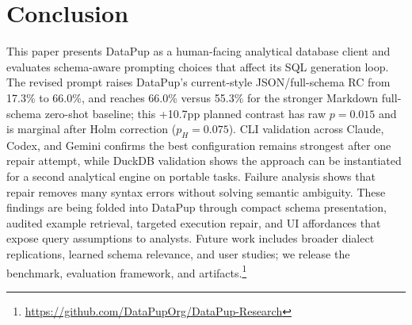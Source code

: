 \documentclass[sigconf, nonacm]{acmart}
\begin{document}
\section{Conclusion}
\label{sec:conclusion}

This paper presents DataPup as a human-facing analytical database client and evaluates schema-aware prompting choices that affect its SQL generation loop. The revised prompt raises DataPup's current-style JSON/full-schema RC from 17.3\% to 66.0\%, and reaches 66.0\% versus 55.3\% for the stronger Markdown full-schema zero-shot baseline; this +10.7pp planned contrast has raw $p{=}0.015$ and is marginal after Holm correction ($p_H{=}0.075$). CLI validation across Claude, Codex, and Gemini confirms the best configuration remains strongest after one repair attempt, while DuckDB validation shows the approach can be instantiated for a second analytical engine on portable tasks. Failure analysis shows that repair removes many syntax errors without solving semantic ambiguity. These findings are being folded into DataPup through compact schema presentation, audited example retrieval, targeted execution repair, and UI affordances that expose query assumptions to analysts. Future work includes broader dialect replications, learned schema relevance, and user studies; we release the benchmark, evaluation framework, and artifacts.\footnote{\url{https://github.com/DataPupOrg/DataPup-Research}}
\end{document}
